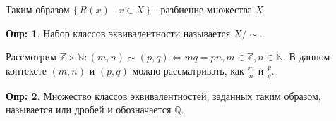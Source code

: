\documentclass[12pt]{article}
\theoremstyle{definition}
\newtheorem{defn}{Опр:}
\begin{document}
Таким образом $\{\,R(x) \mid x \in X\,\}$ - разбиение множества $X$.

\begin{defn}
	Набор классов эквивалентности называется  $X/\sim$.
\end{defn}

Рассмотрим $\mathbb{Z}\times \mathbb{N}: (m,n) \sim (p,q) \Leftrightarrow mq = pn, m \in \mathbb{Z}, n \in \mathbb{N}$. В данном контексте $(m,n)$ и $(p,q)$ можно рассматривать, как $\frac{m}{n}$ и $\frac{p}{q}$.

\begin{defn}
	Множество классов эквивалентностей, заданных таким образом, называется  или дробей и обозначается $\mathbb{Q}$.
\end{defn}
\end{document}
